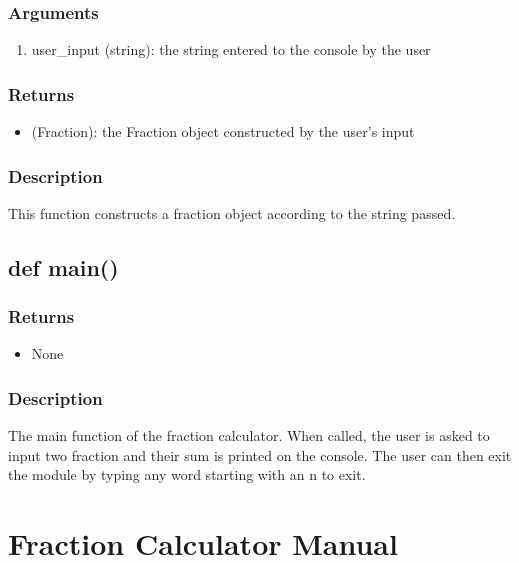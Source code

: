 \documentclass[refman]{scrartcl}
\begin{document}
\subsubsection*{Arguments}

\begin{enumerate}
	\item user\_input (string): the string entered to the console by the user
\end{enumerate}

\subsubsection*{Returns}

\begin{itemize}
	\item (Fraction): the Fraction object constructed by the user's input
\end{itemize}

\subsubsection*{Description}

This function constructs a fraction object according to the string passed.

\subsection{def main()}

\subsubsection*{Returns}

\begin{itemize}
	\item None
\end{itemize}

\subsubsection*{Description}

The main function of the fraction calculator. When called, the user is asked to input two fraction and their sum is printed on the console. The user can then exit the module by typing any word starting with an n to exit.

\section{Fraction Calculator Manual}
\end{document}
